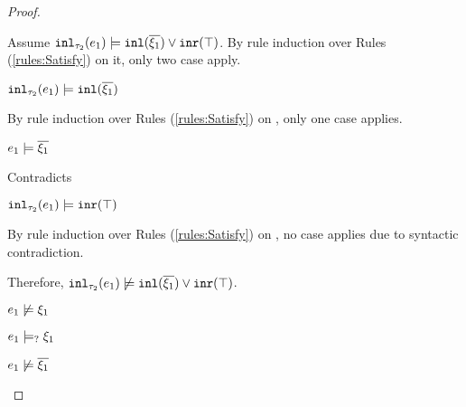 \begin{proof}
\begin{byCases}
\begin{byCases}
\begin{byCases}
            Assume $\mathtt{inl}_{\tau_2}({e_1}) \models \mathtt{inl}(\overline{\xi_1}) \vee \mathtt{inr}(\top)$. By rule induction over Rules (\ref{rules:Satisfy}) on it, only two case apply.
            \begin{byCases}
            \item[\text{(\ref{rule:CSOr1})}]
                \begin{pfsteps*}
                \item $\mathtt{inl}_{\tau_2}({e_1}) \models \mathtt{inl}(\overline{\xi_1})$  
                \end{pfsteps*}
                By rule induction over Rules (\ref{rules:Satisfy}) on , only one case applies.
                \begin{byCases}
                \item[\text{(\ref{rule:CSInl})}]
                    \begin{pfsteps*}
                    \item $e_1 \models \overline{\xi_1}$ 
                    \end{pfsteps*}
                    Contradicts 
                \end{byCases}
            \item[\text{(\ref{rule:CSOr2})}]
                \begin{pfsteps*}
                \item $\mathtt{inl}_{\tau_2}({e_1}) \models \mathtt{inr}(\top)$  
                \end{pfsteps*}
                By rule induction over Rules (\ref{rules:Satisfy}) on , no case applies due to syntactic contradiction.
            \end{byCases}
            Therefore, $\mathtt{inl}_{\tau_2}({e_1}) \not\models \mathtt{inl}(\overline{\xi_1}) \vee \mathtt{inr}(\top)$.
        \item[\cmaysatisfy{e_1}{\xi_1}]
            \begin{pfsteps*}
            \item $e_1 \not\models \xi_1$  
            \item $e_1 \models_{?} \xi_1$  
            \item $e_1 \not\models \overline{\xi_1}$  

\end{pfsteps*}
\end{byCases}
\end{byCases}
\end{byCases}
\end{proof}
